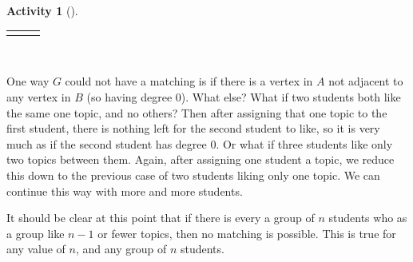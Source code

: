 \documentclass[10pt,]{book}
\theoremstyle{plain}
\theoremstyle{definition}
\theoremstyle{definition}
\theoremstyle{definition}
\newtheorem{activity}[project]{Activity}
\numberwithin{equation}{chapter}
\newlength{\panelmax}
\begin{document}
\begin{activity}[]
{\begin{lrbox}{\panelboxCimage}
{{
}
}\end{lrbox}
\ifdefined\phCimage\else\newlength{\phCimage}\fi%
\setlength{\phCimage}{\ht\panelboxCimage+\dp\panelboxCimage}
\settototalheight{\phCimage}{\usebox{\panelboxCimage}}
\setlength{\panelmax}{\maxof{\panelmax}{\phCimage}}
\leavevmode%
\setlength{\tabcolsep}{0.0166666666666667\linewidth}
\par\medskip\noindent
\hspace*{0.0166666666666667\linewidth}%
\begin{tabular}{@{}*{3}{c}@{}}
\begin{minipage}[c][\panelmax][b]{0.2\linewidth}\usebox{\panelboxAimage}\end{minipage}&
\begin{minipage}[c][\panelmax][b]{0.3\linewidth}\usebox{\panelboxBimage}\end{minipage}&
\begin{minipage}[c][\panelmax][b]{0.4\linewidth}\usebox{\panelboxCimage}\end{minipage}\end{tabular}\\
}%
\end{activity}
\hypertarget{p-438}{}%
One way \(G\) could not have a matching is if there is a vertex in \(A\) not adjacent to any vertex in \(B\) (so having degree 0). What else? What if two students both like the same one topic, and no others? Then after assigning that one topic to the first student, there is nothing left for the second student to like, so it is very much as if the second student has degree 0. Or what if three students like only two topics between them. Again, after assigning one student a topic, we reduce this down to the previous case of two students liking only one topic. We can continue this way with more and more students. %
\par
\hypertarget{p-439}{}%
It should be clear at this point that if there is every a group of \(n\) students who as a group like \(n-1\) or fewer topics, then no matching is possible. This is true for any value of \(n\), and any group of \(n\) students.%
\par
\hypertarget{p-440}{}%
\end{document}

